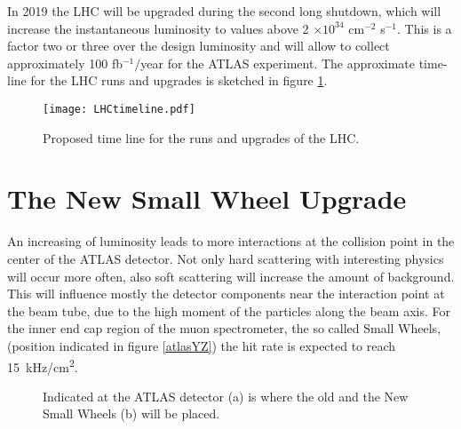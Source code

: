 \documentclass[
a4paper,                                %
twoside,                                %
BCOR1.4cm,                      %
10pt,                           %
headings=normal,                %
headsepline,                    %
clearplainpage, %
final,                                  %
div=14,
parskip=full,
openright,
bibliography=toc
]{scrreprt}
\begin{document}
In 2019 the LHC will be upgraded during the second long shutdown, which will increase the instantaneous luminosity to values above 2 $\times 10^{34}$ cm$^{-2}$ s$^{-1}$. This is a factor two or three over the design luminosity and will allow to collect approximately 100 fb$^{-1}/$year for the ATLAS experiment. The approximate time-line for the LHC runs and upgrades is sketched in figure \ref{lhcTime}.

\begin{figure}[H]
	\centering
	\texttt{[image: LHCtimeline.pdf]}
	\caption{Proposed time line for the runs and upgrades of the LHC.}
	\label{lhcTime}
\end{figure}

\section{The New Small Wheel Upgrade}\label{NSWupgrade}

An increasing of luminosity leads to more interactions at the collision point in the center of the ATLAS detector. Not only hard scattering with interesting physics will occur more often, also soft scattering will increase the amount of background. This will influence mostly the detector components near the interaction point at the beam tube, due to the high moment of the particles along the beam axis. For the inner end cap region of the muon spectrometer, the so called Small Wheels, (position indicated in figure \ref{atlasYZ}) the hit rate is expected to reach \SI{15}{\kHz/\cm\squared}. \cite{NSW_TDR}

\begin{figure}[H]	
	\centering
	\qquad
	\caption{Indicated at the ATLAS detector (a) is where the old and the New Small Wheels (b) will be placed.}
	\label{atlasNSW}
\end{figure}
\end{document}
